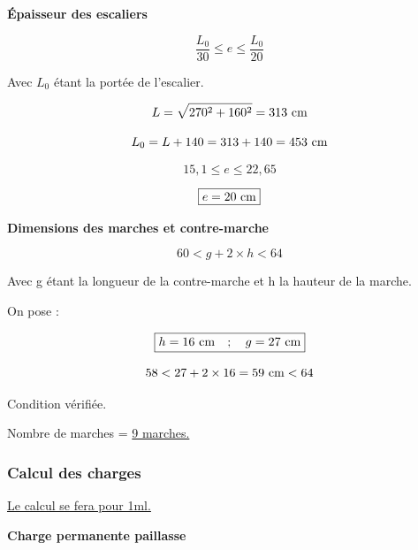 \textbf{Épaisseur des escaliers}

\[ \dfrac{L_{0}}{30} \leq e \leq \dfrac{L_{0}}{20} \]

Avec $L_{0}$ étant la portée de l'escalier.

\[ L = \sqrt{270^{2} + 160^{2}} = 313\cml \]

\[ L_{0} = L + 140 = 313 + 140 = 453\cml  \]

\vspace{\baselineskip}

\[ 15,1 \leq e \leq 22,65 \]

\[ \fbox{$e = 20\cml$} \]


\textbf{Dimensions des marches et contre-marche}

\[ 60 < g + 2 \times h < 64 \]

Avec g étant la longueur de la contre-marche et h la hauteur de la marche.

On pose : 

\[ \fbox{$h = 16\cml \quad;\quad g = 27\cml$} \]

\[ 58 < 27 + 2 \times 16 = 59\cml < 64 \]
{\centering Condition vérifiée.\par}

Nombre de marches = \underline{9 marches.}



\subsubsection{Calcul des charges}

\underline{Le calcul se fera pour 1ml.}

\vspace{\baselineskip}

\textbf{Charge permanente paillasse}

